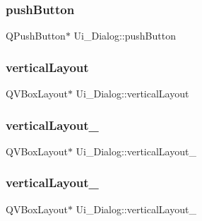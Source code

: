 \subsubsection{\texorpdfstring{push\+Button}{pushButton}}
{\footnotesize\ttfamily Q\+Push\+Button$\ast$ Ui\+\_\+\+Dialog\+::push\+Button}

\hypertarget{class_ui___dialog_a02f973813b741621c5461918b3d9d4bb}{}\label{class_ui___dialog_a02f973813b741621c5461918b3d9d4bb} 
\subsubsection{\texorpdfstring{vertical\+Layout}{verticalLayout}}
{\footnotesize\ttfamily Q\+V\+Box\+Layout$\ast$ Ui\+\_\+\+Dialog\+::vertical\+Layout}

\hypertarget{class_ui___dialog_a4fb6d1c8d4780f0d513f4a48af4a2b10}{}\label{class_ui___dialog_a4fb6d1c8d4780f0d513f4a48af4a2b10} 
\subsubsection{\texorpdfstring{vertical\+Layout\+\_}{verticalLayout\_2}}
{\footnotesize\ttfamily Q\+V\+Box\+Layout$\ast$ Ui\+\_\+\+Dialog\+::vertical\+Layout\+\_}

\hypertarget{class_ui___dialog_acd165ec013acc890cb290ce16b9563f6}{}\label{class_ui___dialog_acd165ec013acc890cb290ce16b9563f6} 
\subsubsection{\texorpdfstring{vertical\+Layout\+\_}{verticalLayout\_3}}
{\footnotesize\ttfamily Q\+V\+Box\+Layout$\ast$ Ui\+\_\+\+Dialog\+::vertical\+Layout\+\_}

\hypertarget{class_ui___dialog_a5ea05598d639698eabf0cbc00b1f0180}{}\label{class_ui___dialog_a5ea05598d639698eabf0cbc00b1f0180} 
